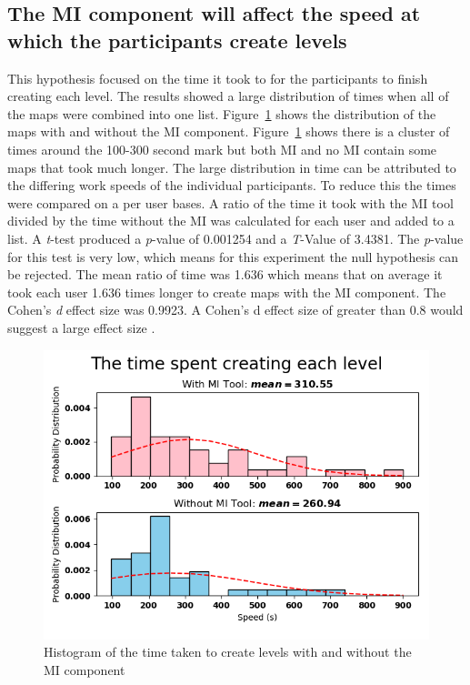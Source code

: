 \documentclass[journal]{IEEEtran}
\begin{document}
\subsection{The MI component will affect the speed at which the participants create levels}\label{speedSec}
This hypothesis focused on the time it took to for the participants to finish creating each level. The results showed a large distribution of times when all of the maps were combined into one list.  Figure~\ref{speedDoubleHist} shows the distribution of the maps with and without the MI component. Figure~\ref{speedDoubleHist} shows there is a cluster of times around the 100-300 second mark but both MI and no MI contain some maps that took much longer. The large distribution in time can be attributed to the differing work speeds of the individual participants. To reduce this the times were compared on a per user bases. A ratio of the time it took with the MI tool divided by the time without  the MI was calculated for each user and added to a list. A \textit{t}-test produced a \textit{p}-value of 0.001254 and a \textit{T}-Value of 3.4381. The \textit{p}-value for this test is very low, which means for this experiment the null hypothesis can be rejected. The mean ratio of time was 1.636 which means that on average it took each user 1.636 times longer to create maps with the MI component. The Cohen's \textit{d} effect size was 0.9923. A Cohen's d effect size of greater than 0.8 would suggest a large effect size \cite{cohen1988statistical}.

\begin{figure}[h]
	\includegraphics[width=1.0\linewidth]{Thetimespentcreatingeachlevel.png}
	\caption{Histogram of the time taken to create levels with and without the MI component}
	\label{speedDoubleHist}
\end{figure} 
\end{document}
